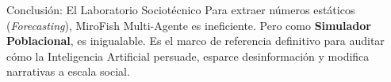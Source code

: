 \documentclass[final]{beamer}
\newlength{\sepwidth}
\newlength{\colwidth}
\newcommand{\separatorcolumn}{\begin{column}{\sepwidth}\end{column}}
\begin{document}
\begin{frame}[t]
\begin{columns}[t]
\begin{column}{\colwidth}
\begin{block}{Conclusión: El Laboratorio Sociotécnico}
    \vspace{0.5cm}
    Para extraer números estáticos (\textit{Forecasting}), MiroFish Multi-Agente es ineficiente. Pero como \textbf{Simulador Poblacional}, es inigualable. Es el marco de referencia definitivo para auditar cómo la Inteligencia Artificial persuade, esparce desinformación y modifica narrativas a escala social.

  \end{block}

\end{column}

\separatorcolumn
\end{columns}
\end{frame}
\end{document}
